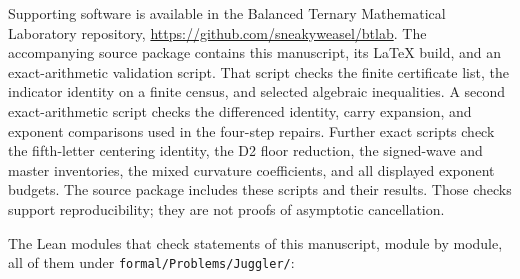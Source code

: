 \documentclass[11pt,a4paper]{article}
\begin{document}
\endgroup

Supporting software is available in the Balanced Ternary Mathematical
Laboratory repository, \url{https://github.com/sneakyweasel/btlab}. The
accompanying source package contains this manuscript, its LaTeX build,
and an exact-arithmetic validation script. That script checks the finite
certificate list, the indicator identity on a finite census, and
selected algebraic inequalities. A second exact-arithmetic script checks
the differenced identity, carry expansion, and exponent comparisons used
in the four-step repairs. Further exact scripts check the fifth-letter
centering identity, the D2 floor reduction, the signed-wave and master
inventories, the mixed curvature coefficients, and all displayed
exponent budgets. The source package includes these scripts and their
results. Those checks support reproducibility; they are not proofs of
asymptotic cancellation.

The Lean modules that check statements of this manuscript, module by
module, all of them under \texttt{formal/Problems/Juggler/}:
\end{document}
